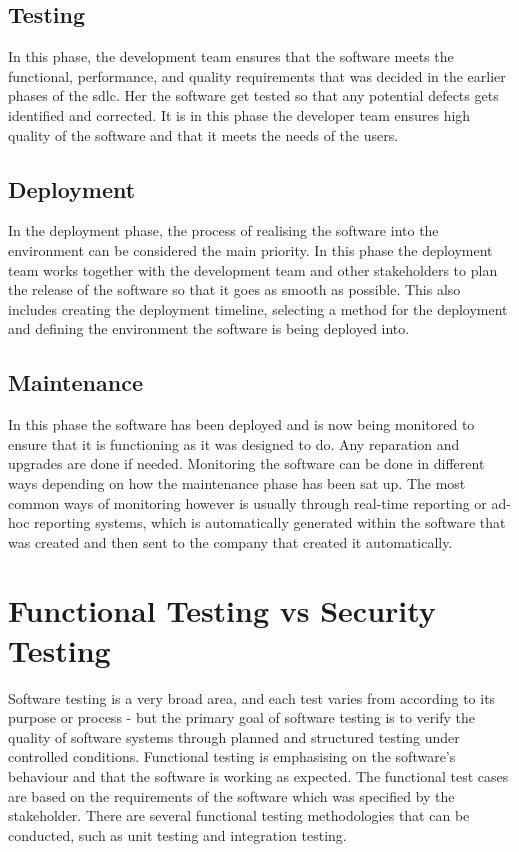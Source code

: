  \subsection{Testing}
 In this phase, the development team ensures that the software meets the functional, performance, and quality requirements that was decided in the earlier phases of the \acrshort{sdlc}. Her the software get tested so that any potential defects gets identified and corrected. It is in this phase the developer team ensures high quality of the software and that it meets the needs of the users. \cite{TestingSDLC}
 
\subsection{Deployment}
In the deployment phase, the process of realising the software into the environment can be considered the main priority. In this phase the deployment team works together with the development team and other stakeholders to plan the release of the software so that it goes as smooth as possible. This also includes creating the deployment timeline, selecting a method for the deployment and defining the environment the software is being deployed into. \cite{DeploymentSDLC}

\subsection{Maintenance} 
In this phase the software has been deployed and is now being monitored to ensure that it is functioning as it was designed to do. Any reparation and upgrades are done if needed. Monitoring the software can be done in different ways depending on how the maintenance phase has been sat up. The most common ways of monitoring however is usually through real-time reporting or ad-hoc reporting systems, which is automatically generated within the software that was created and then sent to the company that created it automatically.\cite{MaintenanceSDLC} 

\section{Functional Testing vs Security Testing}
Software testing is a very broad area, and each test varies from according to its purpose or process - but the primary goal of software testing is to verify the quality of software systems through planned and structured testing under controlled conditions. Functional testing is emphasising on the software's behaviour and that the software is working as expected. The functional test cases are based on the requirements of the software which was specified by the stakeholder. There are several functional testing methodologies that can be conducted, such as unit testing and integration testing.\cite{difftesting} 

